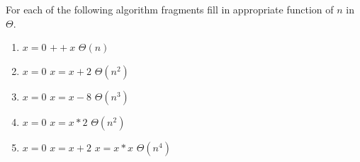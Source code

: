 \documentclass[12pt]{article}
\newenvironment{problem}[2][Problem]{\begin{trivlist}
\item[\hskip \labelsep {\bfseries #1}\hskip \labelsep {\bfseries #2.}]}{\end{trivlist}}
\begin{document}
\begin{problem}{10}
For each of the following algorithm fragments fill in appropriate function of $n$ in
$\Theta$.
\end{problem}

\begin{enumerate}
 
 \item
 \begin{algorithm}[H]
 \begin{algorithmic}
 \State $x = 0$
   \State $++x$
 \EndFor
 \State $\Theta(n)$
 \end{algorithmic}
 \end{algorithm}
 
  \item
 \begin{algorithm}[H]
 \begin{algorithmic}
 \State $x = 0$
     \State $x = x + 2$
   \EndFor
 \EndFor
 \State $\Theta(n^2)$
 \end{algorithmic}
 \end{algorithm}
 
 \item
 \begin{algorithm}[H]
 \begin{algorithmic}
 \State $x = 0$
     \State $x = x - 8$
   \EndFor
 \EndFor
 \State $\Theta(n^3)$
 \end{algorithmic}
 \end{algorithm}
 
 \item
 \begin{algorithm}[H]
 \begin{algorithmic}
 \State $x = 0$
     \State $x = x * 2$
   \EndFor
 \EndFor
 \State $\Theta(n^2)$
 \end{algorithmic}
 \end{algorithm}

 \item
 \begin{algorithm}[H]
 \begin{algorithmic}
 \State $x = 0$
       \State $x = x + 2$
       \State $x = x * x$
     \EndFor
   \EndFor
 \EndFor
 \State $\Theta(n^4)$
 
 \end{algorithmic}
 \end{algorithm}
 
\end{enumerate}


\end{document}
